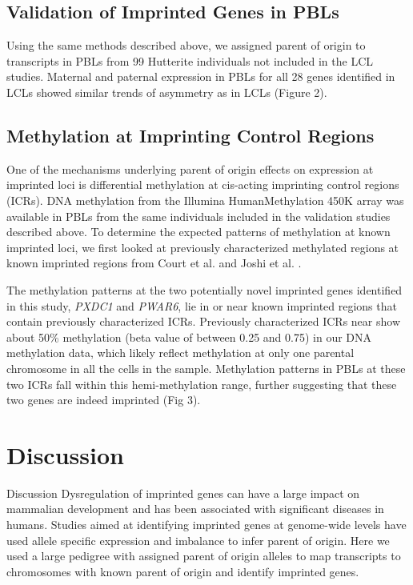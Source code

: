 \subsection{Validation of Imprinted Genes in PBLs}\label{Validation of Imprinted Genes in PBLs}
Using the same methods described above, we assigned parent of origin to transcripts in PBLs from 99 Hutterite individuals not included in the LCL studies. Maternal and paternal expression in PBLs for all 28 genes identified in LCLs showed similar trends of asymmetry as in LCLs (Figure 2). 

\subsection{Methylation at Imprinting Control Regions}\label{Methylation at Imprinting Control Regions}
One of the mechanisms underlying parent of origin effects on expression at imprinted loci is differential methylation at cis-acting imprinting control regions (ICRs). DNA methylation from the Illumina HumanMethylation 450K array was available in PBLs from the same individuals included in the validation studies described above. To determine the expected patterns of methylation at known imprinted loci, we first looked at previously characterized methylated regions at known imprinted regions from Court et al. and Joshi et al. \cite{Court:2014kc,Joshi:2016bb}.

The methylation patterns at the two potentially novel imprinted genes identified in this study, \emph{PXDC1} and \emph{PWAR6}, lie in or near known imprinted regions that contain previously characterized ICRs. Previously characterized ICRs near show about 50\% methylation (beta value of between 0.25 and 0.75) in our DNA methylation data, which likely reflect methylation at only one parental chromosome in all the cells in the sample. Methylation patterns in PBLs at these two ICRs fall within this hemi-methylation range, further suggesting that these two genes are indeed imprinted (Fig 3).

\section{Discussion}\label{ch03-discussion}

Discussion
Dysregulation of imprinted genes can have a large impact on mammalian development and has been associated with significant diseases in humans. Studies aimed at identifying imprinted genes at genome-wide levels have used allele specific expression and imbalance to infer parent of origin. Here we used a large pedigree with assigned parent of origin alleles to map transcripts to chromosomes with known parent of origin and identify imprinted genes. 

